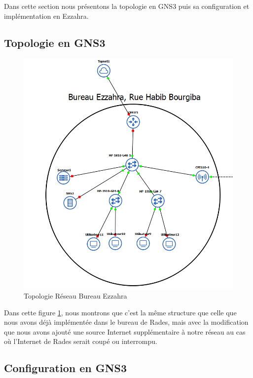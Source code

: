 Dans cette section nous présentons la topologie en GNS3 puis sa configuration et implémentation en Ezzahra.


\subsection{Topologie en GNS3}


\begin{figure}[H]
 \centering
    \includegraphics[width=15cm]{Images/BEzzahra-Topologie.png}
    \caption{Topologie Réseau Bureau Ezzahra}
    \label{Chap2.5.1}
\end{figure}    
\smallskip

Dans cette figure \ref{Chap2.5.1}, nous montrons que c'est la même structure que celle que nous avons déjà implémentée dans le bureau de Rades, mais avec la modification que nous avons ajouté une source Internet supplémentaire à notre réseau au cas où l'Internet de Rades serait coupé ou interrompu.


\subsection{Configuration en GNS3}

